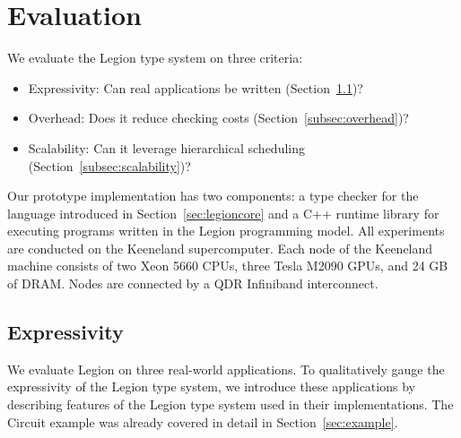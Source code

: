 
\section{Evaluation}
\label{sec:evaluation}

We evaluate the Legion type system on three criteria:
\begin{itemize}
\item Expressivity: Can real applications be written (Section~\ref{subsec:expressivity})?
\item Overhead: Does it reduce checking costs (Section~\ref{subsec:overhead})?
\item Scalability: Can it leverage hierarchical scheduling (Section~\ref{subsec:scalability})?
\end{itemize}
Our prototype implementation has two components: a type checker
for the language introduced in Section~\ref{sec:legioncore} and a C++ runtime library
for executing programs written in the Legion programming model\cite{Legion12}.  All experiments
are conducted on the Keeneland supercomputer\cite{Keeneland}.  Each node of the Keeneland
machine consists of two Xeon 5660 CPUs, three Tesla M2090 GPUs, and 24 GB of DRAM.  Nodes
are connected by a QDR Infiniband interconnect.

\subsection{Expressivity}
\label{subsec:expressivity}
We evaluate Legion on three real-world applications.  To qualitatively gauge the 
expressivity of the Legion type system, we introduce these applications
by describing features of the Legion type system used in their implementations.
The Circuit example was already covered in detail in Section~\ref{sec:example}.


